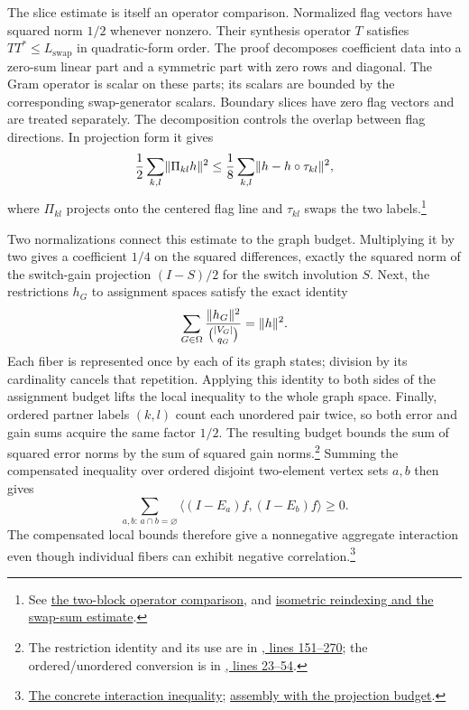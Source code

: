 The slice estimate is itself an operator comparison. Normalized flag
vectors have squared norm $1/2$ whenever nonzero. Their synthesis operator
$T$ satisfies $TT^*\leq L_{\mathrm{swap}}$ in quadratic-form order.
The proof decomposes coefficient data into a zero-sum linear part and a
symmetric part with zero rows and diagonal. The Gram operator is scalar
on these parts; its scalars are bounded by the corresponding swap-generator
scalars. Boundary slices have zero flag vectors and are treated separately.
The decomposition controls the overlap between flag directions. In
projection form it gives
\[
 \frac12\sum_{k,l}\lVert\Pi_{kl}h\rVert^2
 \leq\frac18\sum_{k,l}\lVert h-h\circ\tau_{kl}\rVert^2,
\]
where $\Pi_{kl}$ projects onto the centered flag line and $\tau_{kl}$
swaps the two labels.\footnote{See
\href{https://github.com/openai/math/blob/fd4aeeb2ee4fc729c18d98444fed42fd0529eeeb/lean/OAI/Probability/SwitchChain/SliceOperatorComparison.lean\#L96-L156}{the two-block operator comparison}, and
\href{https://github.com/openai/math/blob/fd4aeeb2ee4fc729c18d98444fed42fd0529eeeb/lean/OAI/Probability/SwitchChain/SliceReindexedComparison.lean\#L49-L79}{isometric reindexing and the swap-sum estimate}.}

Two normalizations connect this estimate to the graph budget. Multiplying
it by two gives a coefficient $1/4$ on the squared differences, exactly
the squared norm of the switch-gain projection $(I-S)/2$ for the switch
involution $S$. Next, the restrictions $h_G$ to assignment spaces satisfy
the exact identity
\[
 \sum_{G\in\Omega}
 \frac{\lVert h_G\rVert^2}{\binom{|V_G|}{q_G}}=\lVert h\rVert^2.
\]
Each fiber is represented once by each of its graph states; division by its
cardinality cancels that repetition. Applying this identity to both sides
of the assignment budget lifts the local inequality to the whole graph
space. Finally, ordered partner labels $(k,l)$ count each unordered pair
twice, so both error and gain sums acquire the same factor $1/2$.
The resulting budget bounds the sum of squared error norms by the sum of
squared gain norms.\footnote{The restriction identity and its use are in
\href{https://github.com/openai/math/blob/fd4aeeb2ee4fc729c18d98444fed42fd0529eeeb/lean/OAI/Probability/SwitchChain/PairEqualityBudget.lean\#L151-L270}{, lines 151--270}; the ordered/unordered conversion is in
\href{https://github.com/openai/math/blob/fd4aeeb2ee4fc729c18d98444fed42fd0529eeeb/lean/OAI/Probability/SwitchChain/PairEqualityBudgetUnordered.lean\#L23-L54}{, lines 23--54}.}
Summing the compensated inequality over ordered disjoint two-element vertex sets $a,b$ then gives
\[
 \sum_{a,b:\,a\cap b=\varnothing}
   \langle(I-E_a)f,(I-E_b)f\rangle\geq0.
\]
The compensated local bounds therefore give a nonnegative aggregate
interaction even though individual fibers can exhibit negative
correlation.\footnote{\href{https://github.com/openai/math/blob/fd4aeeb2ee4fc729c18d98444fed42fd0529eeeb/lean/OAI/Probability/SwitchChain/PairActualAffine.lean\#L81-L101}{The concrete interaction inequality}; \href{https://github.com/openai/math/blob/fd4aeeb2ee4fc729c18d98444fed42fd0529eeeb/lean/OAI/Probability/SwitchChain/PairDisjointAssembly.lean\#L45-L77}{assembly with the projection budget}.}

